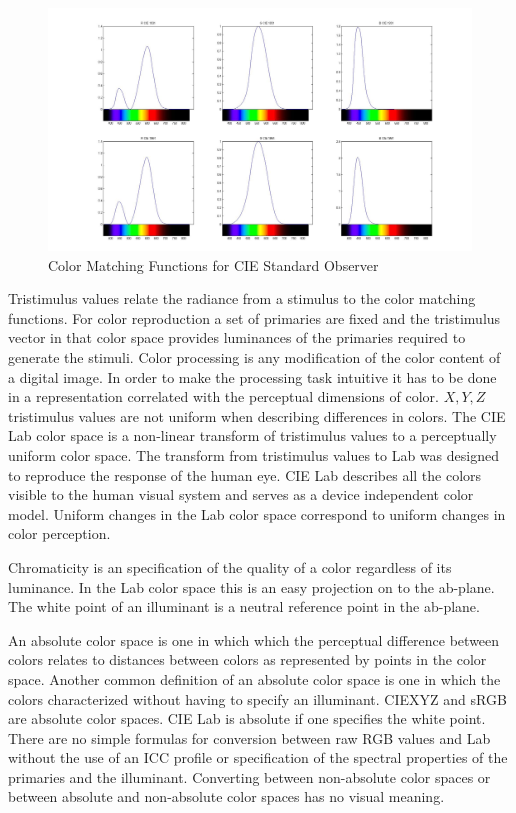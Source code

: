 \begin{figure}
  \caption{Color Matching Functions for CIE Standard Observer}
  \begin{center}
\includegraphics[width=12.0cm]{ColorPaper/XYZ_CMF.jpg}
  \end{center}
\end{figure}
Tristimulus values relate the radiance from a stimulus to the color matching functions.  For color reproduction a set of primaries are fixed and the  tristimulus vector in that color space provides luminances of the primaries required to generate the stimuli.  Color processing is any modification of the color content of a digital image. In order to make the processing task intuitive it has to be done in a representation correlated with the perceptual dimensions of color.  $X, Y, Z$ tristimulus values are not uniform when describing differences in colors.  The CIE Lab color space is a non-linear transform of tristimulus values to a perceptually uniform color space. The transform from tristimulus values to Lab was designed to reproduce the response of the human eye. CIE Lab describes all the colors visible to the human visual system and serves as a device independent color model.  Uniform changes in the Lab color space correspond to uniform changes in color perception.

Chromaticity is an specification of the quality of a color regardless of its luminance. In the Lab color space this is an easy projection on to the ab-plane. The white point of an illuminant is a neutral reference point in the ab-plane.

An absolute color space is one in which which the perceptual difference between colors relates to distances between colors as represented by points in the color space.  Another common definition of an absolute color space is one in which the colors characterized without having to specify an illuminant.
CIEXYZ and sRGB are absolute color spaces. CIE Lab is absolute if one specifies the white point.
There are no simple formulas for conversion between raw RGB values and Lab without the use of an ICC profile or specification of the spectral properties of the primaries and the illuminant.
Converting between non-absolute color spaces or between absolute and non-absolute color spaces has no visual meaning.

